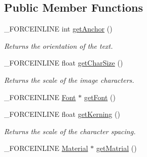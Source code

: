 \subsection*{Public Member Functions}
\begin{DoxyCompactItemize}
\item 
\hypertarget{classcsad_1_1_text_style_ae640d6150ed81fc5283ead658cceadf4}{\-\_\-\-F\-O\-R\-C\-E\-I\-N\-L\-I\-N\-E int \hyperlink{classcsad_1_1_text_style_ae640d6150ed81fc5283ead658cceadf4}{get\-Anchor} ()}\label{classcsad_1_1_text_style_ae640d6150ed81fc5283ead658cceadf4}

\begin{DoxyCompactList}\small\item\em Returns the orientation of the text. \end{DoxyCompactList}\item 
\hypertarget{classcsad_1_1_text_style_aa0b2339391c3902a7738492d112f9e91}{\-\_\-\-F\-O\-R\-C\-E\-I\-N\-L\-I\-N\-E float \hyperlink{classcsad_1_1_text_style_aa0b2339391c3902a7738492d112f9e91}{get\-Char\-Size} ()}\label{classcsad_1_1_text_style_aa0b2339391c3902a7738492d112f9e91}

\begin{DoxyCompactList}\small\item\em Returns the scale of the image characters. \end{DoxyCompactList}\item 
\-\_\-\-F\-O\-R\-C\-E\-I\-N\-L\-I\-N\-E \hyperlink{classcsad_1_1_font}{Font} $\ast$ \hyperlink{classcsad_1_1_text_style_a29e755e840f031d4a495c01377016cf6}{get\-Font} ()
\item 
\hypertarget{classcsad_1_1_text_style_a27e23126f471f26f7c8459b3681cdad0}{\-\_\-\-F\-O\-R\-C\-E\-I\-N\-L\-I\-N\-E float \hyperlink{classcsad_1_1_text_style_a27e23126f471f26f7c8459b3681cdad0}{get\-Kerning} ()}\label{classcsad_1_1_text_style_a27e23126f471f26f7c8459b3681cdad0}

\begin{DoxyCompactList}\small\item\em Returns the scale of the character spacing. \end{DoxyCompactList}\item 
\hypertarget{classcsad_1_1_text_style_a2cc19f704b21124f5cb7629006984e9f}{\-\_\-\-F\-O\-R\-C\-E\-I\-N\-L\-I\-N\-E \hyperlink{classcsad_1_1_material}{Material} $\ast$ \hyperlink{classcsad_1_1_text_style_a2cc19f704b21124f5cb7629006984e9f}{get\-Matrial} ()}\label{classcsad_1_1_text_style_a2cc19f704b21124f5cb7629006984e9f}


\end{DoxyCompactItemize}

